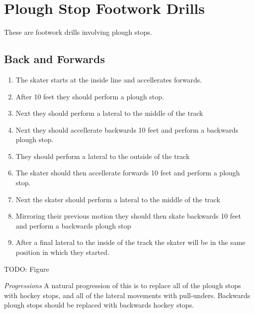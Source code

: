 \section{Plough Stop Footwork Drills}
\label{sec:footwork/plough}

These are footwork drills involving plough stops.

\subsection*{Back and Forwards}
\label{sec:footwork/plough/back_forwards}

\begin{enumerate}
\item The skater starts at the inside line and accellerates forwards.
\item After 10 feet they should perform a plough stop.
\item Next they should perform a lateral to the middle of the track 
\item Next they should accellerate backwards 10 feet and perform a backwards plough stop. 
\item They should perform a lateral to the outside of the track
\item The skater should then accellerate forwards 10 feet and perform a plough stop. 
\item Next the skater should perform a lateral to the middle of the track
\item Mirroring their previous motion they should then skate backwards 10 feet and perform a backwards plough stop  
\item After a final lateral to the inside of the track the skater will be in the same position in which they started.  
\end{enumerate}

{\color{red} TODO: Figure}

{\it Progressions}
A natural progression of this is to replace all of the plough stops with hockey stops, and all of the lateral movements with pull-unders. Backwards plough stops should be replaced with backwards hockey stops. 
